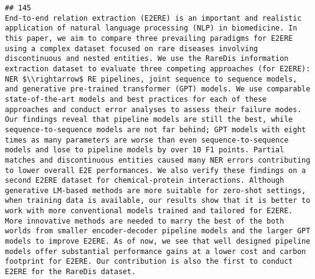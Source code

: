 \documentclass[
]{article}
\begin{document}
\begin{verbatim}
## 145                                                                                                                                                                      End-to-end relation extraction (E2ERE) is an important and realistic application of natural language processing (NLP) in biomedicine. In this paper, we aim to compare three prevailing paradigms for E2ERE using a complex dataset focused on rare diseases involving discontinuous and nested entities. We use the RareDis information extraction dataset to evaluate three competing approaches (for E2ERE): NER $\\rightarrow$ RE pipelines, joint sequence to sequence models, and generative pre-trained transformer (GPT) models. We use comparable state-of-the-art models and best practices for each of these approaches and conduct error analyses to assess their failure modes. Our findings reveal that pipeline models are still the best, while sequence-to-sequence models are not far behind; GPT models with eight times as many parameters are worse than even sequence-to-sequence models and lose to pipeline models by over 10 F1 points. Partial matches and discontinuous entities caused many NER errors contributing to lower overall E2E performances. We also verify these findings on a second E2ERE dataset for chemical-protein interactions. Although generative LM-based methods are more suitable for zero-shot settings, when training data is available, our results show that it is better to work with more conventional models trained and tailored for E2ERE. More innovative methods are needed to marry the best of the both worlds from smaller encoder-decoder pipeline models and the larger GPT models to improve E2ERE. As of now, we see that well designed pipeline models offer substantial performance gains at a lower cost and carbon footprint for E2ERE. Our contribution is also the first to conduct E2ERE for the RareDis dataset.

\end{verbatim}
\end{document}
